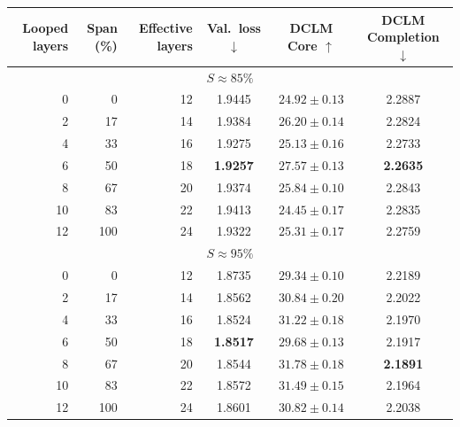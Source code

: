 \documentclass[]{bytedance_seed}
\theoremstyle{definition}
\theoremstyle{remark}
\begin{document}
\begin{center}
\begin{minipage}{\linewidth}
\small
{}
\label{tab:loop-span}
\centering
\begin{tabular}{rrrccc}
\toprule
Looped layers & Span (\%) & Effective layers &
Val.\ loss $\downarrow$ & DCLM Core $\uparrow$ & DCLM Completion $\downarrow$ \\
\midrule
\multicolumn{6}{c}{$S \approx 85\%$} \\
0  & 0   & 12 & 1.9445 & $24.92 \pm 0.13$ & 2.2887 \\
2  & 17  & 14 & 1.9384 & $26.20 \pm 0.14$ & 2.2824 \\
4  & 33  & 16 & 1.9275 & $25.13 \pm 0.16$ & 2.2733 \\
6  & 50  & 18 & \textbf{1.9257} & $\mathbf{27.57 \pm 0.13}$ & \textbf{2.2635} \\
8  & 67  & 20 & 1.9374 & $25.84 \pm 0.10$ & 2.2843 \\
10 & 83  & 22 & 1.9413 & $24.45 \pm 0.17$ & 2.2835 \\
12 & 100 & 24 & 1.9322 & $25.31 \pm 0.17$ & 2.2759 \\
\midrule
\multicolumn{6}{c}{$S \approx 95\%$} \\
0  & 0   & 12 & 1.8735 & $29.34 \pm 0.10$ & 2.2189 \\
2  & 17  & 14 & 1.8562 & $30.84 \pm 0.20$ & 2.2022 \\
4  & 33  & 16 & 1.8524 & $31.22 \pm 0.18$ & 2.1970 \\
6  & 50  & 18 & \textbf{1.8517} & $29.68 \pm 0.13$ & 2.1917 \\
8  & 67  & 20 & 1.8544 & $\mathbf{31.78 \pm 0.18}$ & \textbf{2.1891} \\
10 & 83  & 22 & 1.8572 & $31.49 \pm 0.15$ & 2.1964 \\
12 & 100 & 24 & 1.8601 & $30.82 \pm 0.14$ & 2.2038 \\
\bottomrule
\end{tabular}
\end{minipage}
\end{center}
\end{document}
